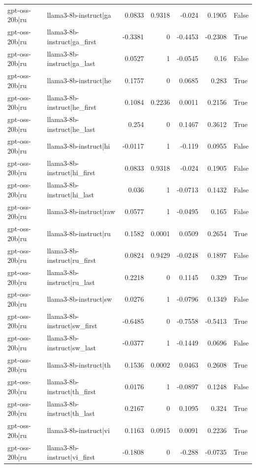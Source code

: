 \begin{table}
\begin{tabular}{l l r r r r l}
gpt-oss-20b|ru & llama3-8b-instruct|ga & 0.0833 & 0.9318 & -0.024 & 0.1905 & False \\
gpt-oss-20b|ru & llama3-8b-instruct|ga_first & -0.3381 & 0 & -0.4453 & -0.2308 & True \\
gpt-oss-20b|ru & llama3-8b-instruct|ga_last & 0.0527 & 1 & -0.0545 & 0.16 & False \\
gpt-oss-20b|ru & llama3-8b-instruct|he & 0.1757 & 0 & 0.0685 & 0.283 & True \\
gpt-oss-20b|ru & llama3-8b-instruct|he_first & 0.1084 & 0.2236 & 0.0011 & 0.2156 & True \\
gpt-oss-20b|ru & llama3-8b-instruct|he_last & 0.254 & 0 & 0.1467 & 0.3612 & True \\
gpt-oss-20b|ru & llama3-8b-instruct|hi & -0.0117 & 1 & -0.119 & 0.0955 & False \\
gpt-oss-20b|ru & llama3-8b-instruct|hi_first & 0.0833 & 0.9318 & -0.024 & 0.1905 & False \\
gpt-oss-20b|ru & llama3-8b-instruct|hi_last & 0.036 & 1 & -0.0713 & 0.1432 & False \\
gpt-oss-20b|ru & llama3-8b-instruct|raw & 0.0577 & 1 & -0.0495 & 0.165 & False \\
gpt-oss-20b|ru & llama3-8b-instruct|ru & 0.1582 & 0.0001 & 0.0509 & 0.2654 & True \\
gpt-oss-20b|ru & llama3-8b-instruct|ru_first & 0.0824 & 0.9429 & -0.0248 & 0.1897 & False \\
gpt-oss-20b|ru & llama3-8b-instruct|ru_last & 0.2218 & 0 & 0.1145 & 0.329 & True \\
gpt-oss-20b|ru & llama3-8b-instruct|sw & 0.0276 & 1 & -0.0796 & 0.1349 & False \\
gpt-oss-20b|ru & llama3-8b-instruct|sw_first & -0.6485 & 0 & -0.7558 & -0.5413 & True \\
gpt-oss-20b|ru & llama3-8b-instruct|sw_last & -0.0377 & 1 & -0.1449 & 0.0696 & False \\
gpt-oss-20b|ru & llama3-8b-instruct|th & 0.1536 & 0.0002 & 0.0463 & 0.2608 & True \\
gpt-oss-20b|ru & llama3-8b-instruct|th_first & 0.0176 & 1 & -0.0897 & 0.1248 & False \\
gpt-oss-20b|ru & llama3-8b-instruct|th_last & 0.2167 & 0 & 0.1095 & 0.324 & True \\
gpt-oss-20b|ru & llama3-8b-instruct|vi & 0.1163 & 0.0915 & 0.0091 & 0.2236 & True \\
gpt-oss-20b|ru & llama3-8b-instruct|vi_first & -0.1808 & 0 & -0.288 & -0.0735 & True \\

\end{tabular}
\end{table}
